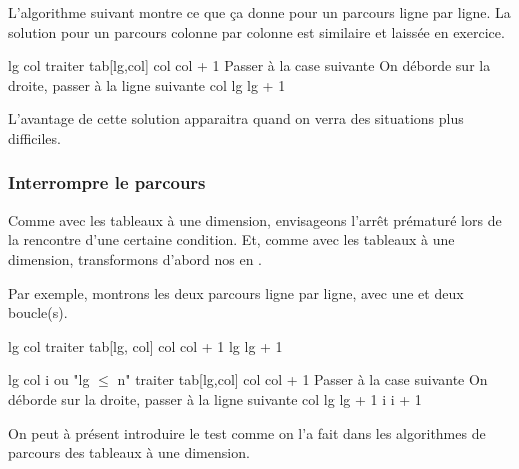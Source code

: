 L'algorithme suivant montre ce que ça donne
pour un parcours ligne par ligne.
La solution pour un parcours colonne par colonne est similaire
et laissée en exercice.

\begin{Pseudocode}
	\Let lg 
	\Let col 
		\Stmt traiter tab[lg,col]
		\Let col \Gets col + 1	\RComment Passer à la case suivante
		 \RComment On déborde sur la droite, passer à la ligne suivante
			\Let col 
			\Let lg \Gets lg + 1
		\EndIf
	\EndFor
\end{Pseudocode}

L'avantage de cette solution apparaitra 
quand on verra des situations plus difficiles.

\subsubsection*{Interrompre le parcours}

Comme avec les tableaux à une dimension, 
envisageons l'arrêt prématuré lors de la rencontre d'une certaine condition.
Et, comme avec les tableaux à une dimension, 
transformons d'abord nos  en .

Par exemple, montrons les deux parcours ligne par ligne, avec une et deux boucle(s).

\begin{Pseudocode}
	\Let lg 
		\Let col 
			\Stmt traiter tab[lg, col]
			\Let col \Gets col + 1
		\EndWhile
		\Let lg \Gets lg + 1
	\EndWhile
\end{Pseudocode}

\begin{Pseudocode}
	\Let lg 
	\Let col 
	\Let i 
	 \RComment ou "lg $\le$ n" 
		\Stmt traiter tab[lg,col]
		\Let col \Gets col + 1	\RComment Passer à la case suivante
		 \RComment On déborde sur la droite, passer à la ligne suivante
			\Let col 
			\Let lg \Gets lg + 1
		\EndIf
		\Let i \Gets i + 1		
	\EndWhile
\end{Pseudocode}

On peut à présent introduire le test comme on l'a fait 
dans les algorithmes de parcours des tableaux à une dimension.

